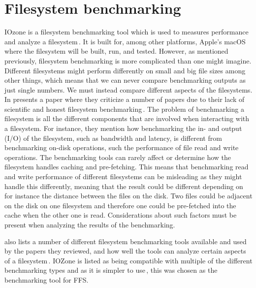\section{Filesystem benchmarking}
IOzone is a filesystem benchmarking tool which is used to measures performance and analyze a filesystem\,\cite{IozoneFilesystemBenchmark}. It is built for, among other platforms, Apple's macOS where the filesystem will be built, run, and tested. However, as mentioned previously, filesystem benchmarking is more complicated than one might imagine. Different filesystems might perform differently on small and big file sizes among other things, which means that we can never compare benchmarking outputs as just single numbers. We must instead compare different aspects of the filesystems. In \citeyear{tarasovBenchmarkingFileSystem2011} \citeauthor{tarasovBenchmarkingFileSystem2011} presents a paper where they criticize a number of papers due to their lack of scientific and honest filesystem benchmarking\,\cite{tarasovBenchmarkingFileSystem2011}. The problem of benchmarking a filesystem is all the different components that are involved when interacting with a filesystem. For instance, they mention how benchmarking the in- and output (I/O) of the filesystem, such as bandwidth and latency, is different from benchmarking on-disk operations, such the performance of file read and write operations. The benchmarking tools can rarely affect or determine how the filesystem handles caching and pre-fetching. This means that benchmarking read and write performance of different filesystems can be misleading as they might handle this differently, meaning that the result could be different depending on for instance the distance between the files on the disk. Two files could be adjacent on the disk on one filesystem and therefore one could be pre-fetched into the cache when the other one is read. Considerations about such factors must be present when analyzing the results of the benchmarking.

\citeauthor{tarasovBenchmarkingFileSystem2011} also lists a number of different filesystem benchmarking tools available and used by the papers they reviewed, and how well the tools can analyze certain aspects of a filesystem\,\cite{tarasovBenchmarkingFileSystem2011}. IOZone is listed as being compatible with multiple of the different benchmarking types and as it is simpler to use\,\cite{agarwalComparingIOBenchmarks2018}, this was chosen as the benchmarking tool for FFS.